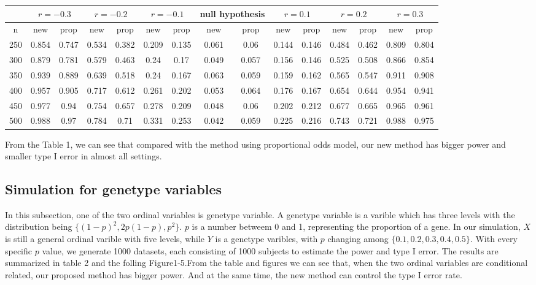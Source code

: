 \documentclass[a4,11pt,epsf, amssymb]{article}
\begin{document}
\begin{CJK}{GBK}{song}
\begin{table}
\begin{tabular}{|c|c|c|c|c|c|c|c|c|c|c|c|c|c|c|}
\hline
& \multicolumn{2}{|c|}{$r = -0.3$} & \multicolumn{2}{|c|}{$r = -0.2$} & \multicolumn{2}{|c|}{$r = -0.1$} &
 \multicolumn{2}{|c|}{null hypothesis} & \multicolumn{2}{|c|}{$r = 0.1$} & \multicolumn{2}{|c|}{$r = 0.2$} &
  \multicolumn{2}{|c|}{$r = 0.3$}\\
\hline
n & new & prop & new & prop & new & prop & new & prop &
 new & prop & new & prop & new & prop \\

\hline
250 & 0.854 & 0.747 & 0.534 & 0.382 & 0.209 & 0.135 & 0.061 & 0.06 & 0.144 & 0.146 & 0.484 & 0.462 & 0.809 & 0.804 \\
300 & 0.879 & 0.781 & 0.579 & 0.463 & 0.24 & 0.17 &
0.049 & 0.057 & 0.156 & 0.146 & 0.525 & 0.508 & 0.866 & 0.854\\
350 & 0.939 & 0.889 & 0.639 & 0.518 & 0.24 & 0.167 &
0.063 & 0.059 & 0.159 & 0.162 & 0.565 & 0.547 & 0.911 &  0.908 \\
400 & 0.957 & 0.905 & 0.717 & 0.612 & 0.261 & 0.202 &
0.053 & 0.064 & 0.176 & 0.167 & 0.654 & 0.644 & 0.954 &  0.941 \\
450 & 0.977 & 0.94 & 0.754 & 0.657 & 0.278 & 0.209 &
0.048 & 0.06 & 0.202 & 0.212 & 0.677 & 0.665 & 0.965 &
0.961 \\
500 & 0.988 & 0.97 & 0.784 & 0.71 & 0.331 & 0.253 &
0.042 & 0.059 & 0.225 & 0.216 & 0.743 & 0.721 & 0.988&
0.975 \\
\hline

\end{tabular}
\end{table}


From the Table 1, we can see that compared with the method using proportional odds model, our new method has bigger power and smaller type I error in almost all settings.


\subsection{Simulation for genetype variables}

In this subsection, one of the two ordinal variables is genetype variable. A genetype variable is a varible which has three levels with the distribution being $\{(1-p)^2, 2p(1-p), p^2\}$. $p$ is a number betweem 0 and 1, representing the proportion of a gene. In our simulation, $X$ is still a general ordinal varible with five levels, while $Y$ is a genetype varibles, with $p$ changing among $\{0.1, 0.2, 0.3, 0.4, 0.5\}$. With every specific $p$ value, we generate 1000 datasets, each consisting of 1000 subjects to estimate the power and type I error.
The results are summarized in table 2 and the folling Figure1-5.From the table and figures we can see that, when the two ordinal variables are conditional related, our proposed method has bigger power. And at the same time, the new method can control the type I error rate.\\


\end{CJK}
\end{document}
